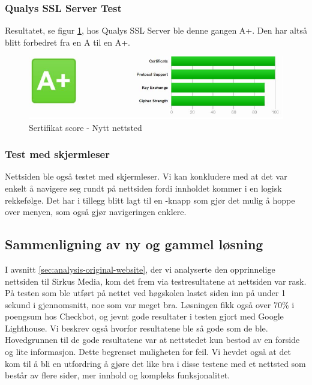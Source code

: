 \subsubsection{Qualys SSL Server Test}
Resultatet, se figur \ref{fig:analysis-new-ssl-test}, hos Qualys SSL Server ble denne gangen A+. Den har altså blitt forbedret fra en A til en A+.

\begin{figure}[H]
    \centering
    \includegraphics[width=\textwidth]{bereket/QSST-test.png}
    \caption{Sertifikat score - Nytt nettsted}
    \label{fig:analysis-new-ssl-test}
\end{figure}

\subsubsection{Test med skjermleser}
Nettsiden ble også testet med skjermleser. Vi kan konkludere med at det var enkelt  å navigere seg rundt på nettsiden fordi innholdet kommer i en logisk rekkefølge. Det har i tillegg blitt lagt til en -knapp som gjør det mulig å hoppe over menyen, som også gjør navigeringen enklere.

\subsection{Sammenligning av ny og gammel løsning}
I avsnitt \ref{sec:analysis-original-website}, der vi analyserte den opprinnelige nettsiden til Sirkus Media, kom det frem via testresultatene at nettsiden var rask. På testen som ble utført på nettet ved høgskolen lastet siden inn på under 1 sekund i gjennomsnitt, noe som var meget bra. Løsningen fikk også over 70\% i poengsum hos Checkbot, og jevnt gode resultater i testen gjort med Google Lighthouse.  Vi beskrev også hvorfor resultatene ble så gode som de ble. Hovedgrunnen til de gode resultatene var at nettstedet kun bestod av en forside og lite informasjon. Dette begrenset muligheten for feil. Vi hevdet også at det kom til å bli en utfordring å gjøre det like bra i disse testene med et nettsted som består av flere sider, mer innhold og kompleks funksjonalitet.

